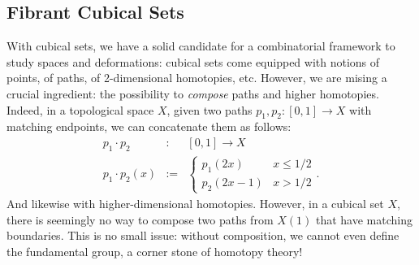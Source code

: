 






\subsection{Fibrant Cubical Sets}

With cubical sets, we have a solid candidate for a combinatorial framework to
study spaces and deformations: cubical sets come equipped with notions of points, 
of paths, of 2-dimensional homotopies, etc.
% 
However, we are mising a crucial ingredient: the possibility to 
\emph{compose} paths and higher homotopies. Indeed, in a topological
space \( X \), given two paths \( p_1, p_2 : [0, 1] \to X \) with matching
endpoints, we can concatenate them as follows:
\[
    \begin{array}{lcl}
    p_1 \cdot p_2 & : & [0 , 1] \to X \\
    p_1 \cdot p_2 (x) & := &
        \left\{ 
            \begin{array}{ll} 
                p_1 (2x) & x \le 1/2 \\ 
                p_2 (2x - 1) & x > 1/2 
            \end{array} 
        \right. .
    \end{array}
\]
And likewise with higher-dimensional homotopies. However, in a cubical set
\( X \), there is seemingly no way to compose two paths from \( X(1) \) that 
have matching boundaries. 
% 
This is no small issue: without composition, we cannot even define the
fundamental group, a corner stone of homotopy theory!

